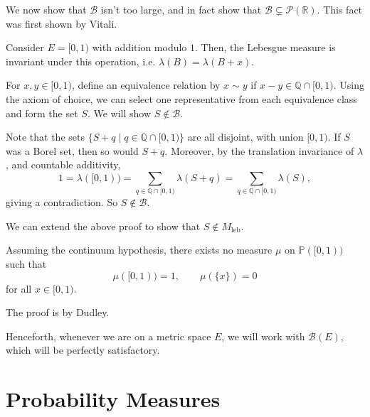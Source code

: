 \documentclass[12pt]{article}
\begin{document}

We now show that $\mathcal{B}$ isn't too large, and in fact show that $\mathcal{B} \subsetneq \mathcal{P}(\mathbb{R})$. This fact was first shown by Vitali.

Consider $E = [0, 1)$ with addition modulo $1$. Then, the Lebesgue measure is invariant under this operation, i.e. $\lambda(B) = \lambda(B+x)$.

For $x, y \in [0,1)$, define an equivalence relation by $x \sim y$ if $x - y \in \mathbb{Q} \cap [0, 1)$. Using the axiom of choice, we can select one representative from each equivalence class and form the set $S$. We will show $S \not \in \mathcal{B}$.

Note that the sets $\{S+q \mid q \in \mathbb{Q} \cap [0,1)\}$ are all disjoint, with union $[0, 1)$. If $S$ was a Borel set, then so would $S+q$. Moreover, by the translation invariance of $\lambda$, and countable additivity,
\[
	1 = \lambda([0,1)) = \sum_{q \in \mathbb{Q} \cap [0,1)} \lambda(S+q) = \sum_{q \in \mathbb{Q} \cap [0,1)} \lambda(S),
\]
giving a contradiction. So $S \not \in \mathcal{B}$.

We can extend the above proof to show that $S \not \in M_{\mathrm{leb}}$.

\begin{theorem}
	Assuming the continuum hypothesis, there exists no measure $\mu$ on $\mathbb{P}([0,1))$ such that
	\[
		\mu([0,1)) = 1, \qquad \mu(\{x\}) = 0
	\]
	for all $x \in [0,1)$.
\end{theorem}

The proof is by Dudley.

Henceforth, whenever we are on a metric space $E$, we will work with $\mathcal{B}(E)$, which will be perfectly satisfactory.

\newpage

\section{Probability Measures}
\label{sec:prob_meas}
\end{document}

